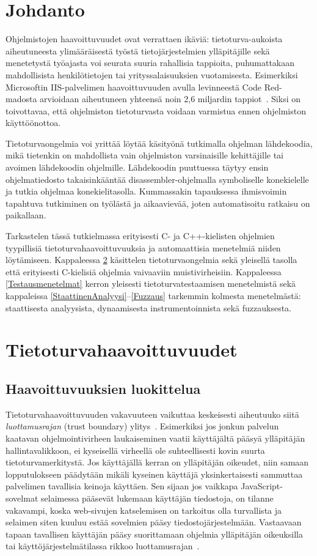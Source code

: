 \section{Johdanto}

Ohjelmistojen haavoittuvuudet ovat verrattaen ikäviä:
tietoturva-aukoista aiheutuneesta ylimääräisestä työstä tietojärjestelmien ylläpitäjille
sekä menetetystä työajasta voi seurata suuria rahallisia tappioita,
puhumattakaan mahdollisista henkilötietojen tai yrityssalaisuuksien vuotamisesta.
Esimerkiksi Microsoftin IIS-palvelimen haavoittuvuuden avulla levinneestä Code Red-madosta
arvioidaan aiheutuneen yhteensä noin 2,6 miljardin tappiot~\cite{CodeRed}.
Siksi on toivottavaa, että ohjelmiston tietoturvasta voidaan varmistua ennen ohjelmiston käyttöönottoa.

Tietoturvaongelmia voi yrittää löytää käsityönä tutkimalla ohjelman lähdekoodia,
mikä tietenkin on mahdollista vain ohjelmiston varsinaisille kehittäjille
tai avoimen lähdekoodin ohjelmille.
Lähdekoodin puuttuessa täytyy ensin ohjelmatiedosto takaisinkääntää
disassembler-ohjelmalla symboliselle konekielelle
ja tutkia ohjelmaa konekielitasolla.
Kummassakin tapauksessa ihmisvoimin tapahtuva tutkiminen on työlästä ja aikaavievää, joten automatisoitu ratkaisu on paikallaan.

Tarkastelen tässä tutkielmassa erityisesti C- ja C++-kielisten ohjelmien tyypillisiä tietoturvahaavoittuvuuksia
ja automaattisia menetelmiä niiden löytämiseen.
Kappaleessa \ref{YleinenTietoturva} käsittelen tietoturvaongelmia sekä yleisellä tasolla
että erityisesti C-kielisiä ohjelmia vaivaaviin muistivirheisiin.
Kappaleessa \ref{Testausmenetelmat} kerron yleisesti tietoturvatestaamisen menetelmistä
sekä kappaleissa \ref{StaattinenAnalyysi}--\ref{Fuzzaus}
tarkemmin kolmesta menetelmästä: staattisesta analyysista, dynaamisesta instrumentoinnista sekä fuzzauksesta.

\section{Tietoturvahaavoittuvuudet}
\label{YleinenTietoturva}
\subsection{Haavoittuvuuksien luokittelua}
Tietoturvahaavoittuvuuden vakavuuteen vaikuttaa keskeisesti aiheutuuko siitä \emph{luottamusrajan}
(trust boundary) ylitys~\cite{ViolatingAssumptions}.
Esimerkiksi jos jonkun palvelun kaatavan ohjelmointivirheen laukaiseminen vaatii käyttäjältä pääsyä
ylläpitäjän hallintavalikkoon, ei kyseisellä virheellä ole suhteellisesti kovin suurta tietoturvamerkitystä.
Jos käyttäjällä kerran on ylläpitäjän oikeudet, niin samaan lopputulokseen päädytään mikäli kyseinen
käyttäjä yksinkertaisesti sammuttaa palvelimen tavallisia keinoja käyttäen.
Sen sijaan jos vaikkapa JavaScript-sovelmat selaimessa pääsevät lukemaan käyttäjän tiedostoja,
on tilanne vakavampi,
koska web-sivujen katselemisen on tarkoitus olla turvallista ja selaimen siten
kuuluu estää sovelmien pääsy tiedostojärjestelmään.
Vastaavaan tapaan tavallisen käyttäjän pääsy suorittamaan ohjelmia ylläpitäjän oikeuksilla
tai käyttöjärjestelmätilassa rikkoo luottamusrajan~\cite{ViolatingAssumptions}.

